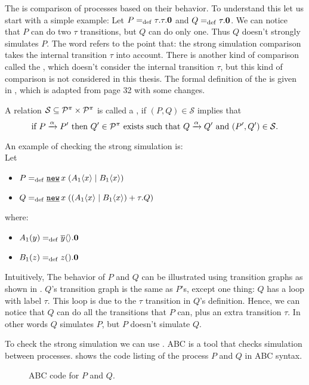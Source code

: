 The  is comparison of processes based on their behavior. To understand this let us start with a simple example:
Let $P=_{\mathrm{def}}\tau.\tau.\mathbf{0}$ and $Q=_{\mathrm{def}}\tau.\mathbf{0}$. We can notice that $P$ can do two $\tau$ transitions, but $Q$ can do only one. Thus $Q$ doesn't strongly simulates $P$. The word  refers to the point that: the strong simulation comparison takes the internal transition $\tau$ into account. There is another kind of comparison called the  , which doesn't consider the internal transition $\tau$, but this kind of comparison is not considered in this thesis. The formal definition of the  is given in , which is adapted from \cite{gieseking} page 32 with some changes.


\begin{definition}
\label{def_strong_sim}
A relation $\mathcal{S}\subseteq\mathcal P^{\pi}\times\mathcal P^{\pi}$ is called a , if $(P,Q)\in\mathcal{S}$ implies that
\[\text{if } P \xrightarrow{\alpha} P' \text{ then }Q'\in\mathcal P^{\pi} \text{ exists such that } Q \xrightarrow{\alpha} Q' \text{ and } (P',Q')\in\mathcal{S}.\]
\end{definition}

An example of checking the strong simulation is:
\\Let
\begin{itemize}
\item $P\define\procres{x}{(\procpar{\proccall{A_1}{x}}{\proccall{B_1}{x}})}$ 
\item $Q\define\procres{x}{(\procchoice{(\procpar{\proccall{A_1}{x}}{\proccall{B_1}{x}})}{\tau.Q})}$
\end{itemize}
where:
\begin{itemize}
\item $A_1(y)=_{\mathrm{def}}{}\overline{y}\langle{}\rangle.\mathbf{0}$
\item $B_1(z)=_{\mathrm{def}}{}z({}).\mathbf{0}$
\end{itemize}

Intuitively, The behavior of $P$ and $Q$ can be illustrated using transition graphs as shown in . $Q$'s transition graph is the same as $P$'s, except one thing: $Q$ has a loop with label $\tau$. This loop is due to the $\tau$ transition in $Q$'s definition. Hence, we can notice that $Q$ can do all the transitions that $P$ can, plus an extra transition $\tau$. In other words $Q$ simulates $P$, but $P$ doesn't simulate $Q$.

To check the strong simulation we can use  \cite{abc}. ABC is a tool that checks simulation between  \picalc{} processes.  shows the code listing of the process $P$ and $Q$ in ABC syntax.
\begin{figure}[ht!]

\caption{ABC code for $P$ and $Q$.}
\label{pi_simulation_ABC_code}
\end{figure}

